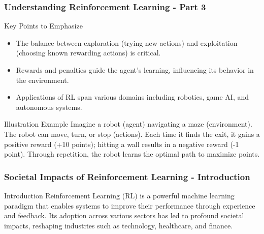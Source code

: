 \documentclass[aspectratio=169]{beamer}
\begin{document}
\begin{frame}[fragile]
    \frametitle{Understanding Reinforcement Learning - Part 3}
    \begin{block}{Key Points to Emphasize}
        \begin{itemize}
            \item The balance between exploration (trying new actions) and exploitation (choosing known rewarding actions) is critical.
            \item Rewards and penalties guide the agent's learning, influencing its behavior in the environment.
            \item Applications of RL span various domains including robotics, game AI, and autonomous systems.
        \end{itemize}
    \end{block}

    \begin{block}{Illustration Example}
        Imagine a robot (agent) navigating a maze (environment). The robot can move, turn, or stop (actions). Each time it finds the exit, it gains a positive reward (+10 points); hitting a wall results in a negative reward (-1 point). Through repetition, the robot learns the optimal path to maximize points.
    \end{block}
\end{frame}

\begin{frame}[fragile]
  \frametitle{Societal Impacts of Reinforcement Learning - Introduction}
  \begin{block}{Introduction}
    Reinforcement Learning (RL) is a powerful machine learning paradigm that enables systems to improve their performance through experience and feedback. Its adoption across various sectors has led to profound societal impacts, reshaping industries such as technology, healthcare, and finance.
  \end{block}
\end{frame}
\end{document}
